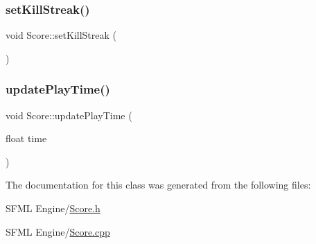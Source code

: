 \mbox{\label{class_score_af0065ea2bf0bf3c1dc92140a1f7e371f}} 
\subsubsection{\texorpdfstring{set\+Kill\+Streak()}{setKillStreak()}}
{\footnotesize\ttfamily void Score\+::set\+Kill\+Streak (\begin{DoxyParamCaption}{ }\end{DoxyParamCaption})}

\mbox{\label{class_score_a767d18294e41930ccece6d48c2398537}} 
\subsubsection{\texorpdfstring{update\+Play\+Time()}{updatePlayTime()}}
{\footnotesize\ttfamily void Score\+::update\+Play\+Time (\begin{DoxyParamCaption}\item[{float}]{time }\end{DoxyParamCaption})}



The documentation for this class was generated from the following files\+:\begin{DoxyCompactItemize}
\item 
S\+F\+M\+L Engine/\hyperlink{_score_8h}{Score.\+h}\item 
S\+F\+M\+L Engine/\hyperlink{_score_8cpp}{Score.\+cpp}\end{DoxyCompactItemize}
